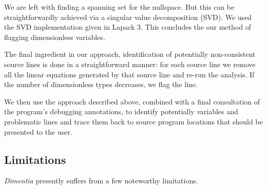 \documentclass[12pt]{article}
\begin{document}
We are left with finding a spanning set for the nullspace. But this can be straightforwardly achieved via a singular value decomposition (SVD). We used the SVD implementation given in Lapack 3. This concludes the our method of flagging dimensionless variables.

The final ingredient in our approach, identification of potentially non-consistent source lines is done in a straightforward manner: for each source line we remove all the linear equations generated by that source line and re-run the analysis. If the number of dimensionless types decreases, we flag the line.

We then use the approach described above, combined with a final consultation of the program's debugging annotations, to identify potentially variables and problematic lines and trace them back to source program locations that should be presented to the user.

\subsection{Limitations}

\textit{Dimentia} presently suffers from a few noteworthy limitations.
\end{document}
